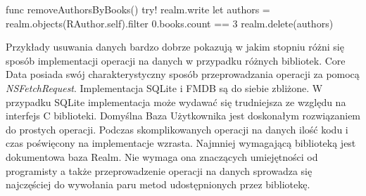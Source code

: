 \begin{code}[
		language=swift,
		caption={Przykład usuwania danych Realm},
		label={lis:realm_delete_code},
	]
    func removeAuthorsByBooks() {
        try! realm.write {
            let authors = realm.objects(RAuthor.self).filter { 0.books.count == 3 }
            realm.delete(authors)
        }
    }
\end{code}

Przykłady usuwania danych bardzo dobrze pokazują w jakim stopniu różni się sposób implementacji operacji na danych w przypadku różnych bibliotek. Core Data posiada swój charakterystyczny sposób przeprowadzania operacji za pomocą \textit{NSFetchRequest}. Implementacja SQLite i FMDB są do siebie zbliżone. W przypadku SQLite implementacja może wydawać się trudniejsza ze względu na interfejs C biblioteki. Domyślna Baza Użytkownika jest doskonałym rozwiązaniem do prostych operacji. Podczas skomplikowanych operacji na danych ilość kodu i czas poświęcony na implementacje wzrasta. Najmniej wymagającą biblioteką jest dokumentowa baza Realm. Nie wymaga ona znaczących umiejętności od programisty a także przeprowadzenie operacji na danych sprowadza się najczęściej do wywołania paru metod udostępnionych przez bibliotekę.

